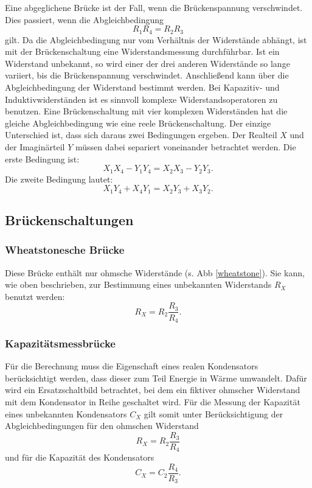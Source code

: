 Eine abgeglichene Brücke ist der Fall, wenn die Brückenspannung verschwindet.
Dies passiert, wenn die Abgleichbedingung
\begin{equation*}
    R_1 R_4 = R_2 R_3
\end{equation*}
gilt.
Da die Abgleichbedingung nur vom Verhältnis der Widerstände abhängt, 
ist mit der Brückenschaltung eine Widerstandsmessung durchführbar. 
Ist ein Widerstand unbekannt, so wird einer der drei anderen Widerstände so lange variiert, bis die Brückenspannung verschwindet. 
Anschließend kann über die Abgleichbedingung der Widerstand bestimmt werden. 
\newline
Bei Kapazitiv- und Induktivwiderständen ist es sinnvoll komplexe Widerstandsoperatoren zu benutzen. %
Eine Brückenschaltung mit vier komplexen Widerständen hat die gleiche Abgleichbedingung wie eine reele Brückenschaltung. 
Der einzige Unterschied ist, dass sich daraus zwei Bedingungen ergeben. 
Der Realteil $X$ und der Imaginärteil $Y$ müssen dabei separiert voneinander betrachtet werden. 
Die erste Bedingung ist:
\begin{equation*}
    X_1X_4 - Y_1Y_4 = X_2X_3 - Y_2Y_3.
\end{equation*}
Die zweite Bedingung lautet: 
\begin{equation*}
    X_1Y_4 + X_4Y_1 = X_2Y_3 + X_3Y_2.
\end{equation*}

\subsection{Brückenschaltungen}
\subsubsection{Wheatstonesche Brücke}
Diese Brücke enthält nur ohmsche Widerstände (s. Abb \ref{wheatstone}). Sie kann, wie oben beschrieben, zur Bestimmung eines unbekannten Widerstands $R_X$ benutzt werden:
\begin{equation}
    R_X = R_2 \frac{R_3}{R_4}.
    \label{eqn:a_r}
\end{equation}

\subsubsection{Kapazitätsmessbrücke}
Für die Berechnung muss die Eigenschaft eines realen Kondensators berücksichtigt werden, dass dieser zum Teil Energie in Wärme umwandelt. %
Dafür wird ein Ersatzschaltbild betrachtet, bei dem ein fiktiver ohmscher Widerstand mit dem Kondensator in Reihe geschaltet wird. 
Für die Messung der Kapazität eines unbekannten Kondensators $C_X$ gilt somit unter Berücksichtigung der Abgleichbedingungen für den ohmschen 
Widerstand 
\begin{equation}
    R_X = R_2 \frac{R_3}{R_4}
    \label{eqn:b_r}
\end{equation}
und für die Kapazität des Kondensators 
\begin{equation}
    C_X = C_2 \frac{R_4}{R_3}.
    \label{eqn:b_c}
\end{equation}


